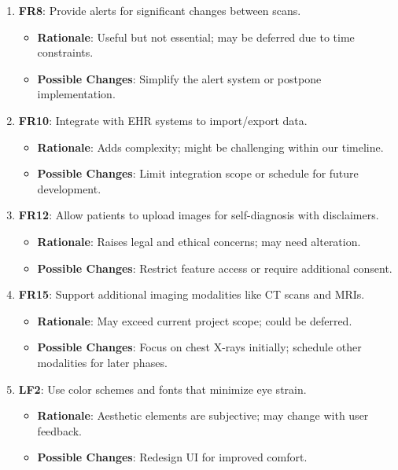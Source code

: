 \documentclass[12pt]{article}
\begin{document}
\begin{enumerate}[resume]
    \item \textbf{FR8}: Provide alerts for significant changes between scans.
    \begin{itemize}[label=-]
        \item \textbf{Rationale}: Useful but not essential; may be deferred due to time constraints.
        \item \textbf{Possible Changes}: Simplify the alert system or postpone implementation.
    \end{itemize}

    \item \textbf{FR10}: Integrate with EHR systems to import/export data.
    \begin{itemize}[label=-]
        \item \textbf{Rationale}: Adds complexity; might be challenging within our timeline.
        \item \textbf{Possible Changes}: Limit integration scope or schedule for future development.
    \end{itemize}

    \item \textbf{FR12}: Allow patients to upload images for self-diagnosis with disclaimers.
    \begin{itemize}[label=-]
        \item \textbf{Rationale}: Raises legal and ethical concerns; may need alteration.
        \item \textbf{Possible Changes}: Restrict feature access or require additional consent.
    \end{itemize}

    \item \textbf{FR15}: Support additional imaging modalities like CT scans and MRIs.
    \begin{itemize}[label=-]
        \item \textbf{Rationale}: May exceed current project scope; could be deferred.
        \item \textbf{Possible Changes}: Focus on chest X-rays initially; schedule other modalities for later phases.
    \end{itemize}

    \item \textbf{LF2}: Use color schemes and fonts that minimize eye strain.
    \begin{itemize}[label=-]
        \item \textbf{Rationale}: Aesthetic elements are subjective; may change with user feedback.
        \item \textbf{Possible Changes}: Redesign UI for improved comfort.
    \end{itemize}


\end{enumerate}
\end{document}
